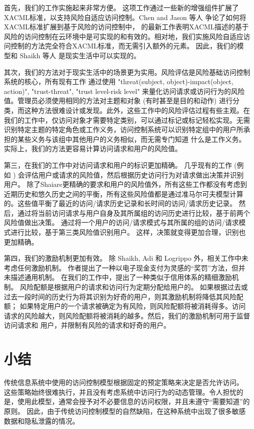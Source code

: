 首先，我们的工作实施起来非常方便。 这项工作通过一些新的增强组件扩展了XACML标准，以支持风险自适应访问控制。Chen and Jason 等人 \cite{Chen2013} 争论了如何将XACML标准扩展到基于风险的访问控制中， \cite{santos2014dynamic} 的最新工作表明XACML描述的基于风险的访问控制在云环境中是可实现的和有效的。相对地，我们实施风险自适应访问控制的方法完全符合XACML标准，而无需引入额外的元素。 因此，我们的模型和 Shaikh 等人 \cite{shaikh2012dynamic} 是现实生活中可以实现的。

其次，我们的方法对于现实生活中的场景更为实用。风险评估是风险基础访问控制系统的核心，所有现有工作 \cite{wang2011quantified, shaikh2012dynamic, khambhammettu2013framework} 通过使用 "threat(subject, object)-impact(object, action)", "trust-threat", "trust level-risk level" 来量化访问请求或访问行为的风险值。管理员必须使用相同的方法对主题和对象 (有时甚至是目的和动作) 进行分类，而这种方法很难设计或发现。此外，这些工作中的风险评估过程有些主观。在我们的工作中，仅访问对象才需要特定类别，可以通过标记或标记轻松实现。无需识别特定主题的特定角色或工作义务，访问控制系统可以识别特定组中的用户所承担的某些义务与该组中其他用户的义务相似，而无需专门知道 什么是工作义务。实际上，我们的方法更容易计算访问请求和用户的风险值。

第三，在我们的工作中对访问请求和用户的标识更加精确。 几乎现有的工作 (例如 \cite{wang2011quantified,shaikh2012dynamic}) 会评估用户或请求的风险值，然后根据历史访问行为对请求做出决策并识别用户。 除了Shaiare更精确的要求和用户的风险值外，所有这些工作都没有考虑到近期历史和悠久历史之间的平衡，所有这些风险值都是通过准马尔可夫模型计算的。这些值平衡了最近的访问/请求历史记录和长时间的访问/请求历史记录。 然后，通过将当前访问请求与用户自身及其所属组的访问历史进行比较，基于前两个风险值做出决策。 通过将一个用户的访问/请求模式与其所属的组的访问/请求模式进行比较，基于第三类风险值识别用户。 这样，决策就变得更加合理，识别也更加精确。

第四，我们的激励机制更加有效。 除 Shaikh, Adi 和 Logrippo \cite{shaikh2012dynamic}外，相关工作中未考虑任何激励机制。 \cite{shaikh2012dynamic} 作者提出了一种以电子现金支付为灵感的“奖罚”方法，但并未描述通用机制。 在我们的工作中，提出了一种类似于信用体系的精细激励机制。 风险配额是根据用户的请求和访问行为定期分配给用户的。 如果根据过去或过去一段时间的历史行为将其识别为好奇的用户，则其激励机制将降低其风险配额； 如果特定用户的一个请求被确定为有风险，则风险配额将被消耗得多。访问请求的风险越大，则风险配额将被消耗的越多。然后，我们的激励机制可用于监督访问请求和 用户，并限制有风险的请求和好奇的用户。

\section{小结}
\label{sec:Conclusion}
传统信息系统中使用的访问控制模型根据固定的预定策略来决定是否允许访问。 这些策略始终很难执行，并且没有考虑系统中访问行为的动态管理。令人担忧的是，使用此模型，通常会授予对不必要信息的访问权限，并且未遵守“需要知道”的原则。 因此，由于传统访问控制模型的自然缺陷，在这种系统中出现了很多敏感数据和隐私泄露的情况。

